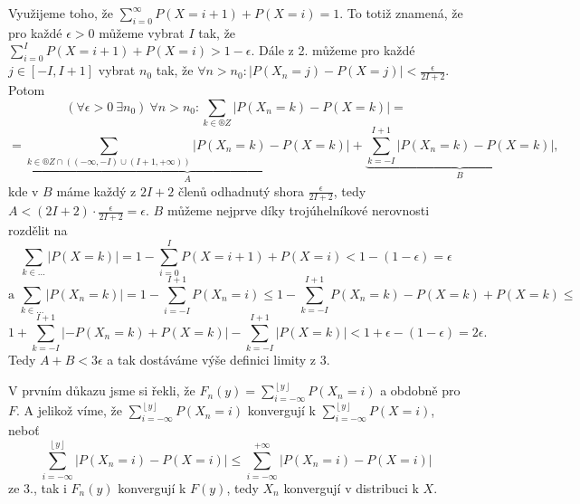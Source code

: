 \documentclass[12pt]{article}					%
\begin{document}
\begin{priklad}
	\begin{dukazin}[„2. $\implies$ 3.“]
		Využijeme toho, že $\sum_{i=0}^∞ P(X = i + 1) + P(X = i) = 1$. To totiž znamená, že pro každé $\epsilon > 0$ můžeme vybrat $I$ tak, že $\sum_{i=0}^I P(X = i + 1) + P(X = i) > 1 - \epsilon$. Dále z 2. můžeme pro každé $j \in [-I, I+1]$ vybrat $n_0$ tak, že $\forall n > n_0: |P(X_n = j) - P(X = j)| < \frac{\epsilon}{2I + 2}$. Potom
		$$ (\forall \epsilon > 0\ \exists n_0)\ \forall n > n_0: \sum_{k \in ®Z}|P(X_n = k) - P(X = k)| = $$
		$$ = \underbrace{\sum_{k \in ®Z \cap ((-∞, -I) \cup (I + 1, +∞))} |P(X_n = k) - P(X = k)|}_A + \underbrace{\sum_{k = -I}^{I + 1} |P(X_n = k) - P(X = k)|}_B, $$
		kde v $B$ máme každý z $2I + 2$ členů odhadnutý shora $\frac{\epsilon}{2I + 2}$, tedy $A < (2I + 2)·\frac{\epsilon}{2I + 2} = \epsilon$. $B$ můžeme nejprve díky trojúhelníkové nerovnosti rozdělit na
		$$ \sum_{k \in …} |P(X = k)| = 1 - \sum_{i=0}^I P(X = i + 1) + P(X = i) < 1 - (1 - \epsilon) = \epsilon $$
		$$ \text{a } \sum_{k \in …} |P(X_n = k)| = 1 - \sum_{i=-I}^{I + 1} P(X_n = i) ≤ 1 - \sum_{k = -I}^{I + 1} P(X_n = k) - P(X = k) + P(X = k) ≤ $$
		$$ 1 + \sum_{k = -I}^{I + 1} |-P(X_n = k) + P(X = k)| - \sum_{k = -I}^{I+1} |P(X = k)| < 1 + \epsilon - (1 - \epsilon) = 2\epsilon. $$
		Tedy $A + B < 3 \epsilon$ a tak dostáváme výše definici limity z 3.
	\end{dukazin}

	\begin{dukazin}[„3. $\implies$ 1.“]
		V prvním důkazu jsme si řekli, že $F_n(y) = \sum_{i = -∞}^{\left\lfloor y \right\rfloor} P(X_n = i)$ a obdobně pro $F$. A jelikož víme, že $\sum_{i = -∞}^{\left\lfloor y \right\rfloor} P(X_n = i)$ konvergují k $\sum_{i = -∞}^{\left\lfloor y \right\rfloor} P(X = i)$, neboť
		$$ \sum_{i=-∞}^{\left\lfloor y \right\rfloor} |P(X_n = i) - P(X = i)| ≤ \sum_{i=-∞}^{+∞} |P(X_n = i) - P(X = i)| $$
		ze 3., tak i $F_n(y)$ konvergují k $F(y)$, tedy $X_n$ konvergují v distribuci k $X$.
	\end{dukazin}
\end{priklad}
\end{document}
